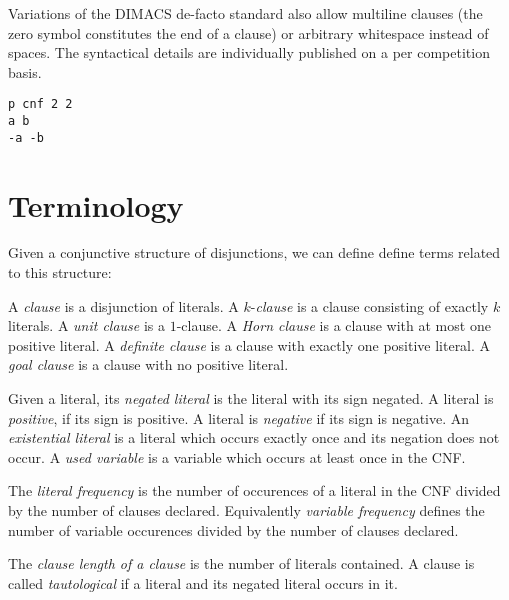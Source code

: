 Variations of the DIMACS de-facto standard also allow multiline clauses (the
zero symbol constitutes the end of a clause) or arbitrary whitespace instead of
spaces. The syntactical details are individually published on a per competition
basis.

\renewcommand{\lstlistingname}{Listing}  %
\begin{lstlisting}[caption={Display~\ref{eq:xor} represented in DIMACS format}]
p cnf 2 2
a b
-a -b
\end{lstlisting}

\section{Terminology}
\label{sec:sat-terminology}
%
Given a conjunctive structure of disjunctions, we can define define terms
related to this structure:

\begin{defi}
  A \emph{clause} is a disjunction of literals.
  A $k$-\emph{clause} is a clause consisting of exactly $k$ literals.
  A \emph{unit clause} is a $1$-clause.
  A \emph{Horn clause} is a clause with at most one positive literal.
  A \emph{definite clause} is a clause with exactly one positive literal.
  A \emph{goal clause} is a clause with no positive literal.
\end{defi}

\begin{defi}
  Given a literal, its \emph{negated literal} is the literal with its sign negated.
  A literal is \emph{positive}, if its sign is positive. A literal is \emph{negative} if its sign is negative.
  An \emph{existential literal} is a literal which occurs exactly once and
  its negation does not occur. A \emph{used variable} is a variable which
  occurs at least once in the CNF.

  The \emph{literal frequency} is the number of occurences of a literal in the CNF divided by the number of clauses declared. Equivalently \emph{variable frequency} defines the number of variable occurences divided by the number of clauses declared.
\end{defi}

\begin{defi}
  The \emph{clause length of a clause} is the number of literals contained.
  A clause is called \emph{tautological} if a literal and its negated literal occurs in it.
\end{defi}

